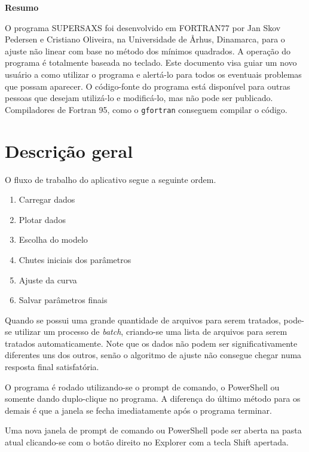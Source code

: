 \begin{apendicesenv}
\textbf{Resumo}

O programa SUPERSAXS foi desenvolvido em FORTRAN77 por Jan Skov Pedersen e Cristiano Oliveira, na Universidade de Århus, Dinamarca, para o ajuste não linear com base no método dos mínimos quadrados. A operação do programa é totalmente baseada no teclado. Este documento visa guiar um novo usuário a como utilizar o programa e alertá-lo para todos os eventuais problemas que possam aparecer. O código-fonte do programa está disponível para outras pessoas que desejam utilizá-lo e modificá-lo, mas não pode ser publicado. Compiladores de Fortran 95, como o \texttt{gfortran} conseguem compilar o código.


\section*{Descrição geral}

O fluxo de trabalho do aplicativo segue a seguinte ordem.

\begin{enumerate}
	\item Carregar dados
	\item Plotar dados
	\item Escolha do modelo
	\item Chutes iniciais dos parâmetros
	\item Ajuste da curva
	\item Salvar parâmetros finais
\end{enumerate}

Quando se possui uma grande quantidade de arquivos para serem tratados, pode-se utilizar um processo de \emph{batch}, criando-se uma lista de arquivos para serem tratados automaticamente. Note que os dados não podem ser significativamente diferentes uns dos outros, senão o algoritmo de ajuste não consegue chegar numa resposta final satisfatória.

O programa é rodado utilizando-se o prompt de comando, o PowerShell ou somente dando duplo-clique no programa. A diferença do último método para os demais é que a janela se fecha imediatamente após o programa terminar.

Uma nova janela de prompt de comando ou PowerShell pode ser aberta na pasta atual clicando-se com o botão direito no Explorer com a tecla Shift apertada.


\end{apendicesenv}
